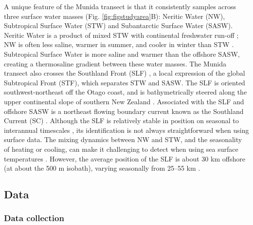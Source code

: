 \documentclass[preprint, 3p, authoryear]{elsarticle} %
\begin{document}
A unique feature of the Munida transect is that it consistently samples across three surface water masses (Fig. \ref{fig:figstudyarea}{B}): Neritic Water (NW), Subtropical Surface Water (STW) and Subantarctic Surface Water (SASW). Neritic Water is a product of mixed STW with continental freshwater run-off \citep{jillett1969, johnson2024}; NW is often less saline, warmer in summer, and cooler in winter than STW \citep{jillett1969}. Subtropical Surface Water is more saline and warmer than the offshore SASW, creating a thermosaline gradient between these water masses. The Munida transect also crosses the Southland Front (SLF) \citep{jillett1969, shaw2001, chiswell2015}, a local expression of the global Subtropical Front (STF), which separates STW and SASW. The SLF is oriented southwest-northeast off the Otago coast, and is bathymetrically steered along the upper continental slope of southern New Zealand \citep{shaw2001, smith2013}. Associated with the SLF and offshore SASW is a northeast flowing boundary current known as the Southland Current (SC) \citep{sutton2003}. Although the SLF is relatively stable in position on seasonal to interannual timescales \citep{hopkins2010}, its identification is not always straightforward when using surface data. The mixing dynamics between NW and STW, and the seasonality of heating or cooling, can make it challenging to detect when using sea surface temperatures \citep{jones2013, johnson2024}. However, the average position of the SLF is about 30 km offshore (at about the 500 m isobath), varying seasonally from 25--55 km \citep{hopkins2010, jones2013}.

\hypertarget{data}{%
\subsection{Data}\label{data}}

\hypertarget{data-collection}{%
\subsubsection{Data collection}\label{data-collection}}
\end{document}
